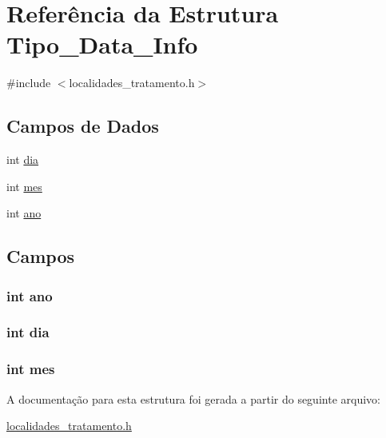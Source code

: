 \hypertarget{struct_tipo___data___info}{}\section{Referência da Estrutura Tipo\+\_\+\+Data\+\_\+\+Info}
\label{struct_tipo___data___info}


{\ttfamily \#include $<$localidades\+\_\+tratamento.\+h$>$}

\subsection*{Campos de Dados}
\begin{DoxyCompactItemize}
\item 
int \hyperlink{struct_tipo___data___info_a3d1171ac670a8e8a672c481f22d1fa9f}{dia}
\item 
int \hyperlink{struct_tipo___data___info_a9fc86758220eae0e735655f81fd9d9bc}{mes}
\item 
int \hyperlink{struct_tipo___data___info_ac404d93cbf0169fd9e89edc17d0c5572}{ano}
\end{DoxyCompactItemize}


\subsection{Campos}
\hypertarget{struct_tipo___data___info_ac404d93cbf0169fd9e89edc17d0c5572}{}
\subsubsection[{ano}]{\setlength{\rightskip}{0pt plus 5cm}int ano}\label{struct_tipo___data___info_ac404d93cbf0169fd9e89edc17d0c5572}
\hypertarget{struct_tipo___data___info_a3d1171ac670a8e8a672c481f22d1fa9f}{}
\subsubsection[{dia}]{\setlength{\rightskip}{0pt plus 5cm}int dia}\label{struct_tipo___data___info_a3d1171ac670a8e8a672c481f22d1fa9f}
\hypertarget{struct_tipo___data___info_a9fc86758220eae0e735655f81fd9d9bc}{}
\subsubsection[{mes}]{\setlength{\rightskip}{0pt plus 5cm}int mes}\label{struct_tipo___data___info_a9fc86758220eae0e735655f81fd9d9bc}


A documentação para esta estrutura foi gerada a partir do seguinte arquivo\+:\begin{DoxyCompactItemize}
\item 
\hyperlink{localidades__tratamento_8h}{localidades\+\_\+tratamento.\+h}\end{DoxyCompactItemize}
